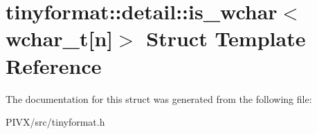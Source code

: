\hypertarget{structtinyformat_1_1detail_1_1is__wchar_3_01wchar__t[n]_4}{}\section{tinyformat\+:\+:detail\+:\+:is\+\_\+wchar$<$ wchar\+\_\+t\mbox{[}n\mbox{]}$>$ Struct Template Reference}
\label{structtinyformat_1_1detail_1_1is__wchar_3_01wchar__t[n]_4}


The documentation for this struct was generated from the following file\+:\begin{DoxyCompactItemize}
\item 
P\+I\+V\+X/src/tinyformat.\+h\end{DoxyCompactItemize}
